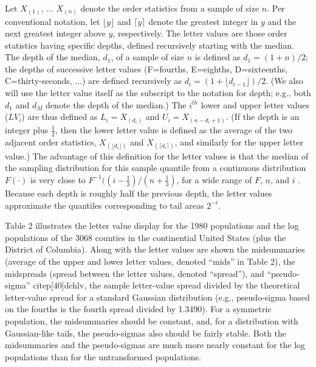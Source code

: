 \documentclass[oneside]{article}
\begin{document}
Let $X_{(1)}$, ...  $X_{(n)}$ denote the order statistics
from a sample of size $n$.
Per conventional notation, let $\lfloor y \rfloor$ and
$\lceil y \rceil$ denote the greatest integer in $y$ and
the next greatest integer above $y$, respectively.
The letter values are those order statistics having specific
depths, defined recursively starting with the median.
The depth of the median, $d_1$, of a sample of size $n$
is defined as $d_1 = (1 +  n )/2$; the depths
of successive letter values (F=fourths, E=eighths, 
D=sixteenths, C=thirty-seconds, ...) are defined recursively 
as $d_i = (1 + \lfloor d_{i-1} \rfloor)/2$.  
(We also will use the letter value itself as the subscript
to the notation for depth; e.g., both $d_1$ and $d_M$ denote
the depth of the median.)
The $i^{th}$ lower and upper letter values  ($LV_i$) 
are thus defined as $L_i = X_{(d_i)}$ and
$U_i = X_{(n-d_i+1)}$.
(If the depth is an integer plus $\frac{1}{2}$, then the lower 
letter value is defined as the average of the two adjacent order
statistics, $X_{(\lfloor d_i \rfloor)}$ and
$X_{(\lceil d_i \rceil)}$, and similarly for the upper
letter value.)
The advantage of this definition for the letter values
is that the median of the sampling distribution for
this sample quantile from a
continuous distribution $F(\cdot)$ is very close to
$F^{-1} ((i - \frac{1}{3})/(n + \frac{1}{3})$, for a 
wide range of $F$, $n$, and $i$ \citep{dchlv}.
Because each depth is roughly half the previous depth,
the letter values approximate the quantiles corresponding
to tail areas $2^{-i}$.

Table 2 illustrates the letter value display for the 1980 
populations and the log populations of the 3068 counties in 
the continential United States (plus the District of Columbia).
Along with the letter values are shown the midsummaries
(average of the upper and lower letter values, denoted ``mids''
in Table 2), 
the midspreads (spread between the letter values, denoted
``spread''), and ``pseudo-sigma'' citep[40]{dchlv}, 
the sample letter-value spread divided by the theoretical
letter-value spread for a standard Gaussian
distribution (e.g., pseudo-sigma based on the fourths is 
the fourth spread divided by 1.3490).
For a symmetric population, the midsummaries should
be constant, and, for a distribution with Gaussian-like
tails, the pseudo-sigmas also should be fairly stable.
Both the midsummaries and the pseudo-sigmas are much more
nearly constant for the log populations than for the
untransformed populations.
\end{document}
